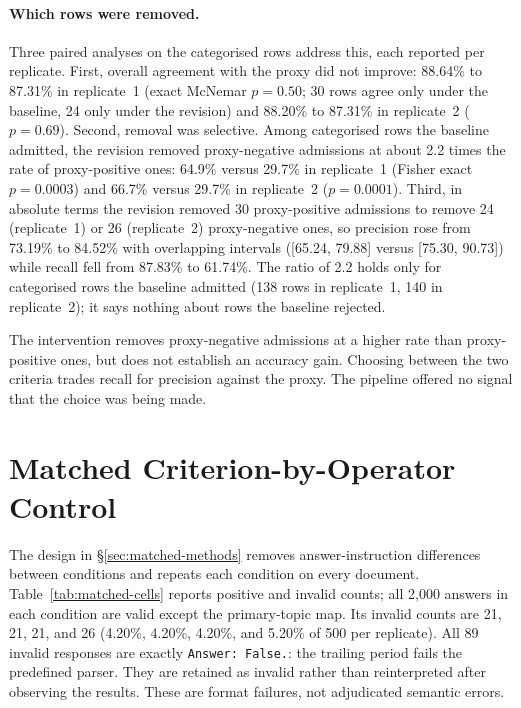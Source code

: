 \documentclass[11pt]{article}
\begin{document}
\paragraph{Which rows were removed.}
Three paired analyses on the categorised rows address this, each reported
per replicate. First, overall agreement with the proxy did not improve:
88.64\% to 87.31\% in replicate~1 (exact McNemar $p = 0.50$; 30 rows agree
only under the baseline, 24 only under the revision) and 88.20\% to 87.31\%
in replicate~2 ($p = 0.69$). Second, removal was selective. Among categorised
rows the baseline admitted, the revision removed proxy-negative admissions
at about 2.2 times the rate of proxy-positive ones: 64.9\% versus 29.7\% in
replicate~1 (Fisher exact $p = 0.0003$) and 66.7\% versus 29.7\% in
replicate~2 ($p = 0.0001$). Third, in absolute terms the revision removed 30
proxy-positive admissions to remove 24 (replicate~1) or 26 (replicate~2)
proxy-negative ones, so precision rose from 73.19\% to 84.52\% with
overlapping intervals ([65.24, 79.88] versus [75.30, 90.73]) while recall fell
from 87.83\% to 61.74\%. The ratio of 2.2 holds only for categorised rows the
baseline admitted (138 rows in replicate~1, 140 in replicate~2); it says
nothing about rows the baseline rejected.

The intervention removes proxy-negative admissions at a higher rate than
proxy-positive ones, but does not establish an accuracy gain. Choosing between the two criteria trades recall for
precision against the proxy. The pipeline offered no signal that the choice
was being made.

\section{Matched Criterion-by-Operator Control}
\label{sec:matched-results}

The design in \S\ref{sec:matched-methods} removes answer-instruction
differences between conditions and repeats each condition on every document.
Table~\ref{tab:matched-cells} reports positive and invalid counts; all
2,000 answers in each condition are valid except the primary-topic map.
Its invalid counts are 21, 21, 21, and 26 (4.20\%, 4.20\%, 4.20\%, and
5.20\% of 500 per replicate). All 89 invalid responses are exactly
\texttt{Answer: False.}: the trailing period fails the predefined parser.
They are retained as invalid rather than reinterpreted after observing the
results. These are format failures, not adjudicated semantic errors.
\end{document}
